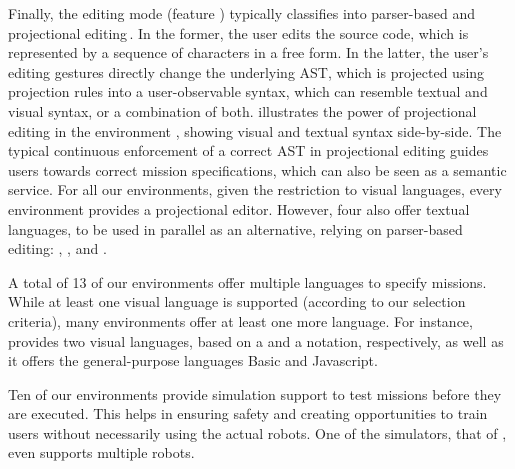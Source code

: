 Finally, the editing mode (feature \feditingmode) typically classifies into parser-based and projectional editing\,\cite{voelter2014projectional,berger2016pe}. In the former, the user edits the source code, which is represented by a sequence of characters in a free form. In the latter, the user's editing gestures directly change the underlying AST, which is projected using projection rules into a user-observable syntax, which can resemble textual and visual syntax, or a combination of both.  illustrates the power of projectional editing in the environment \easyc, showing visual and textual syntax side-by-side. The typical continuous enforcement of a correct AST in projectional editing guides users towards correct mission specifications, which can also be seen as a semantic service. For all our environments, given the restriction to visual languages, every environment provides a projectional editor. However, four also offer textual languages, to be used in parallel as an alternative, relying on parser-based editing: \aseba, \vex, \turtlebot and \robotc.

 A total of 13 of our environments offer multiple languages to specify missions. While at least one visual language is supported (according to our selection criteria), many environments offer at least one more language. For instance, \picaxe provides two visual languages, based on a \fflowchart and a \fblockly notation, respectively, as well as it offers the general-purpose languages Basic and Javascript.



 Ten of our environments provide simulation support to test missions before they are executed. This helps in ensuring safety and creating opportunities to train users without necessarily using the actual robots. One of the simulators, that of \missionlab, even supports multiple robots.

